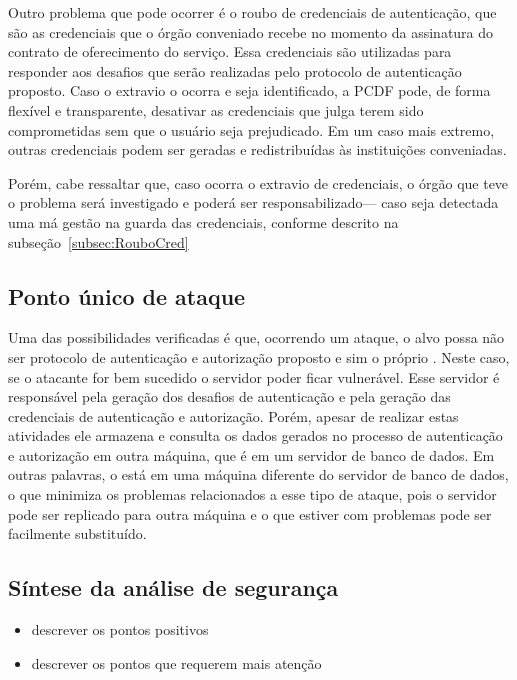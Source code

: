 Outro problema que pode ocorrer é o roubo de credenciais de autenticação, que são as credenciais que o órgão conveniado recebe no momento da assinatura do contrato de oferecimento do serviço. Essa credenciais são utilizadas para responder aos desafios que serão realizadas pelo protocolo de autenticação proposto. Caso o extravio o ocorra e seja identificado, a PCDF pode, de forma flex\'{i}vel e transparente, desativar as credenciais que julga terem sido comprometidas sem que o usuário seja prejudicado. 
Em um caso mais extremo, outras credenciais podem ser geradas e redistribuídas \`{a}s institui\c c\~{o}es conveniadas.

Porém, cabe ressaltar que, caso ocorra o extravio de credenciais, o órgão que teve o problema será investigado e poderá ser responsabilizado--- caso seja detectada uma m\'{a} 
gestão na guarda das credenciais, conforme descrito na subseção~\ref{subsec:RouboCred}


\subsection{Ponto único de ataque}

Uma das possibilidades verificadas é que, ocorrendo um ataque, o alvo possa não ser protocolo de autenticação e autorização proposto e sim o próprio \servidorAA. 
Neste caso, se o atacante for bem sucedido o servidor poder ficar vulnerável. Esse servidor é responsável pela geração dos desafios de autenticação e pela geração das credenciais de autenticação e autorização. Porém, apesar de realizar estas atividades ele armazena e consulta os dados gerados no processo de autenticação e autorização em outra máquina, que é em um servidor de banco de dados. Em outras palavras, o \servidorAA está em uma máquina diferente do servidor de banco de dados, o que minimiza os problemas relacionados a esse tipo de ataque, pois o servidor pode ser replicado para outra máquina e o que estiver com problemas pode ser facilmente substituído.

\subsection{S\'{i}ntese da an\'{a}lise de seguran\c ca}

\begin{itemize}
\item descrever os pontos positivos
\item descrever os pontos que requerem mais aten\c c\~{a}o
\end{itemize}

